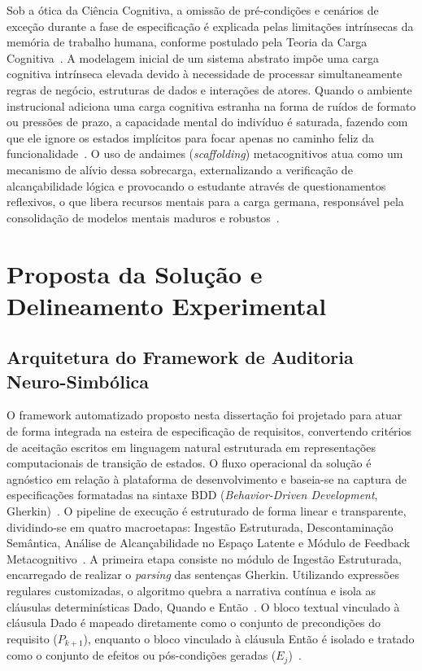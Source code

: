 \documentclass[ruledheader]{abnt_UFF}[abntex2]
\begin{document}
Sob a ótica da Ciência Cognitiva, a omissão de pré-condições e cenários de exceção durante a fase de especificação é explicada pelas limitações intrínsecas da memória de trabalho humana, conforme postulado pela Teoria da Carga Cognitiva~\cite{santiago2023proposta}. A modelagem inicial de um sistema abstrato impõe uma carga cognitiva intrínseca elevada devido à necessidade de processar simultaneamente regras de negócio, estruturas de dados e interações de atores. Quando o ambiente instrucional adiciona uma carga cognitiva estranha na forma de ruídos de formato ou pressões de prazo, a capacidade mental do indivíduo é saturada, fazendo com que ele ignore os estados implícitos para focar apenas no caminho feliz da funcionalidade~\cite{santiago2023proposta}. O uso de andaimes (\textit{scaffolding}) metacognitivos atua como um mecanismo de alívio dessa sobrecarga, externalizando a verificação de alcançabilidade lógica e provocando o estudante através de questionamentos reflexivos, o que libera recursos mentais para a carga germana, responsável pela consolidação de modelos mentais maduros e robustos~\cite{kitchenham2022principles}.


\chapter{Proposta da Solução e Delineamento Experimental}

\section{Arquitetura do Framework de Auditoria Neuro-Simbólica}

O framework automatizado proposto nesta dissertação foi projetado para atuar de forma integrada na esteira de especificação de requisitos, convertendo critérios de aceitação escritos em linguagem natural estruturada em representações computacionais de transição de estados. O fluxo operacional da solução é agnóstico em relação à plataforma de desenvolvimento e baseia-se na captura de especificações formatadas na sintaxe BDD (\textit{Behavior-Driven Development},  Gherkin)~\cite{gonzalez2022improving}. O pipeline de execução é estruturado de forma linear e transparente, dividindo-se em quatro macroetapas: Ingestão Estruturada, Descontaminação Semântica, Análise de Alcançabilidade no Espaço Latente e Módulo de Feedback Metacognitivo~\cite{santiago2023proposta}. A primeira etapa consiste no módulo de Ingestão Estruturada, encarregado de realizar o \textit{parsing} das sentenças Gherkin. Utilizando expressões regulares customizadas, o algoritmo quebra a narrativa contínua e isola as cláusulas determinísticas Dado, Quando e Então~\cite{fischbach2023automatic}. O bloco textual vinculado à cláusula Dado é mapeado diretamente como o conjunto de precondições do requisito ($P_{k+1}$), enquanto o bloco vinculado à cláusula Então é isolado e tratado como o conjunto de efeitos ou pós-condições geradas ($E_j$)~\cite{fischbach2023automatic}.
\end{document}
